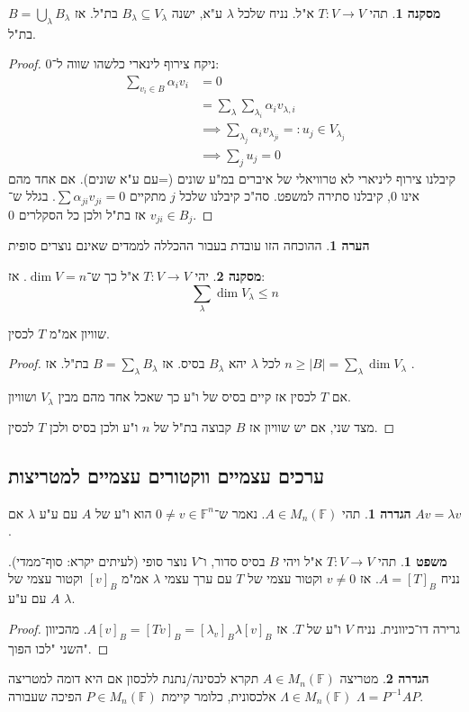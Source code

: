 \documentclass[a4paper]{article}
\newcommand\F         {\mathbb{F}}
\newcommand\co        {\colon}
\newcommand\ag        {\alpha}
\renewcommand\lg      {\lambda}
\newcommand\Lg        {\Lambda}
\newcommand\op    {^{-1}}
\theoremstyle{definition}
\newtheorem{Theorem}{\color{myblue}משפט}
\newtheorem{Definition}{\color{mygreen}הגדרה}
\newtheorem{Remark}{\color{mycyan}הערה}
\newtheorem{Collary}{\color{mymagenta}מסקנה}
\newcommand\cola [1] {\begin{Collary}#1\end{Collary}}
\newcommand\theo  [1] {\begin{Theorem}#1\end{Theorem}}
\newcommand\defi  [1] {\begin{Definition}#1\end{Definition}}
\newcommand\rmark [1] {\begin{Remark}#1\end{Remark}}
\begin{document}
	\cola{תהי $T \co V \to V$ א"ל. נניח שלכל $\lg$ ע"א, ישנה $B_\lg \subseteq V_\lg$ בת"ל. אז $B = \bigcup_{\lg}B_\lg$ בת"ל. }
	
	\begin{proof}ניקח צירוף לינארי כלשהו שווה ל־0: 
		\begin{align*}
			\sum_{v_i \in B} \ag_iv_i &= 0 \\
			&= \sum_{\lg}\sum_{\lg_i}\ag_iv_{\lg, i} \\
			&\implies \sum_{\lg_j}\ag_i v_{\lg_{ji}} =: u_j \in V_{\lg_j} \\
			&\implies \sum_{j}u_j = 0
		\end{align*}
		קיבלנו צירוף ליניארי לא טרוויאלי של איברים במ"ע שונים (=עם ע"א שונים). אם אחד מהם אינו 0, קיבלנו סתירה למשפט. סה"כ קיבלנו שלכל $j$ מתקיים $\sum \ag_{ji}v_{ji} = 0$. בגלל ש־$v_{ji} \in B_j$ אז בת"ל ולכן כל הסקלרים 0. 
	\end{proof}
	\rmark{ההוכחה הזו עובדת בעבור ההכללה לממדים שאינם נוצרים סופית}
	
	\cola{יהי $T \co V \to V$ א"ל כך ש־$\dim V = n$. אז: 
		\[ \sum_\lg \dim V_\lg \le n \]}
	שוויון אמ"מ $T$ לכסין. 
	
	\begin{proof}
		לכל $\lg$ יהא $B_\lg$ בסיס. אז $B = \sum_{\lg}B_\lg$ בת"ל. אז $n \ge |B| = \sum_\lg \dim V_\lg$ . 
		
		אם $T$ לכסין אז קיים בסיס של ו"ע כך שאכל אחד מהם מבין $V_\lg$ ושוויון. 
		
		מצד שני, אם יש שוויון אז $B$ קבוצה בת"ל של $n$ ו"ע ולכן בסיס ולכן $T$ לכסין. 
	\end{proof}
	
	\subsection{ערכים עצמיים ווקטורים עצמיים למטריצות}
	\defi{תהי $A \in M_n(\F)$. נאמר ש־$0 \neq v \in \F^n$ הוא ו"ע של $A$ עם ע"ע $\lg$ אם $Av = \lg v$. }
	
	\theo{תהי $T \co V \to V$ א"ל ויהי $B$ בסיס סדור, ו־$V$ נוצר סופי (לעיתים יקרא: סוף־ממדי). נניח $A = [T]_B$. אז $v \neq 0$ וקטור עצמי של $T$ עם ערך עצמי $\lg$ אמ"מ $[v]_B$ וקטור עצמי של $A$ עם ע"ע $\lg$. }
	
	\begin{proof}
		גרירה דו־כיוונית. 
		נניח $V$ ו"ע של $T$. אז $A[v]_B = [Tv]_B = [\lg_v]_B \lg[v]_B$. מהכיוון השני "לכו הפוך". 
	\end{proof}
	
	\defi{מטריצה $A \in M_n(\F)$ תקרא לכסינה/נתנת ללכסון אם היא דומה למטריצה $\Lambda \in M_n(\F)$ אלכסונית, כלומר קיימת $P \in M_n(\F)$ הפיכה שעבורה $\Lg = P\op AP$. }
	
\end{document}
